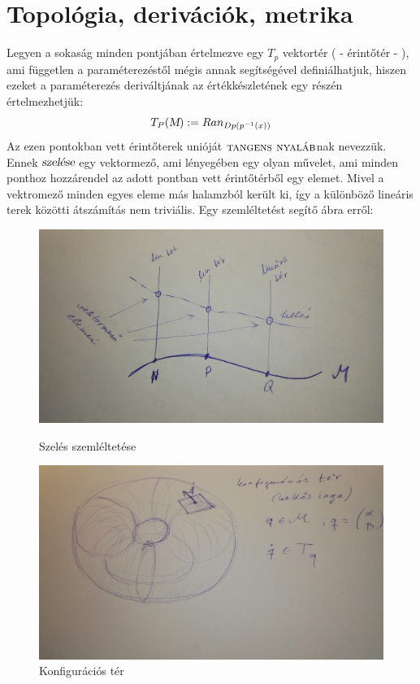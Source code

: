 \documentclass[a4paper, 12pt]{article}
\begin{document}
\section{Topológia, derivációk, metrika}
\par Legyen a sokaság minden pontjában értelmezve egy $T_{p}$ vektortér ( - érintőtér - ), ami független a paraméterezéstől mégis annak segítségével definiálhatjuk, hiszen ezeket a paraméterezés deriváltjának az értékkészletének egy részén értelmezhetjük:
\begin{equation}
T_{P}(\textsl{M}) := Ran_{Dp(p^{-1}(x))}
\end{equation}
Az ezen pontokban vett érintőterek unióját $\textsc{tangens nyaláb}$nak nevezzük. Ennek $\textsl{szelése}$ egy vektormező, ami lényegében egy olyan művelet, ami minden ponthoz hozzárendel az adott pontban vett érintőtérből egy elemet. Mivel a vektromező minden egyes eleme más halamzból került ki, így a különböző lineáris terek közötti átszámítás nem triviális. Egy szemléltetést segítő ábra erről:
\begin{figure}[h!]
\centering
\begin{minipage}{0.46\linewidth}
\centering
\includegraphics[width=0.9\linewidth]{szeles.jpg}
\caption{Szelés szemléltetése}
\end{minipage}
\begin{minipage}{0.46\linewidth}
\centering
\includegraphics[width=0.9\linewidth]{konfi.jpg}
\caption{Konfigurációs tér}
\end{minipage}
\end{figure}
\end{document}
